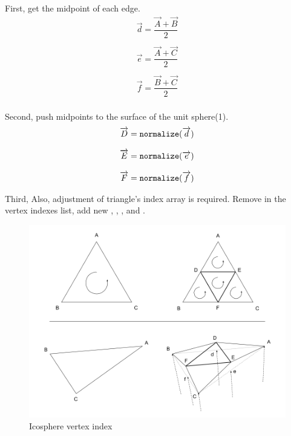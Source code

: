 First, get the midpoint of each edge.
\[
\begin{array}{lr}
\overrightarrow{d} = \dfrac{\overrightarrow{A} + \overrightarrow{B}}{2}\\\\
\overrightarrow{e} = \dfrac{\overrightarrow{A} + \overrightarrow{C}}{2}\\\\
\overrightarrow{f} = \dfrac{\overrightarrow{B} + \overrightarrow{C}}{2}\\
\end{array}
\]

Second, push midpoints to the surface of the unit sphere(1).
\[
\begin{array}{lr}
\overrightarrow{D} = \texttt{normalize}(\overrightarrow{d})\\\\
\overrightarrow{E} = \texttt{normalize}(\overrightarrow{e})\\\\
\overrightarrow{F} = \texttt{normalize}(\overrightarrow{f})\\
\end{array}
\]

Third, Also, adjustment of triangle's index array is required. Remove  in the vertex indexes list, add new , , , and .

\begin{figure}[H]
\caption{Icosphere vertex index}
\label{fig:icosphere-vertex-index}
\centering
\includegraphics[width=\textwidth, keepaspectratio]{Figures/icosphere-vertex-index.png}
\decoRule
\end{figure}

